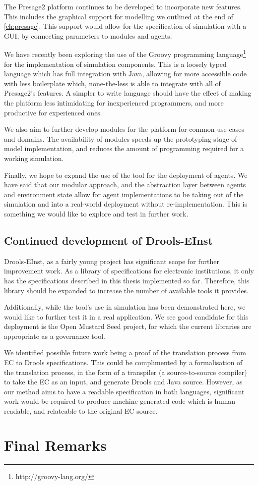 The Presage2 platform continues to be developed to incorporate new features.
This includes the graphical support for modelling we outlined at the end of
\autoref{ch:presage}. This support would allow for the specification of
simulation with a \ac{GUI}, by connecting parameters to modules and agents.

We have recently been exploring the use of the Groovy programming language\footnote{http://groovy-lang.org/} for
the implementation of simulation components. This is a loosely typed language
which has full integration with Java, allowing for more accessible code with
less boilerplate which, none-the-less is able to integrate with all of
Presage2's features. A simpler to write language should have the effect of
making the platform less intimidating for inexperienced programmers, and more
productive for experienced ones.

We also aim to further develop modules for the platform for common use-cases
and domains. The availability of modules speeds up the prototyping stage of
model implementation, and reduces the amount of programming required for a
working simulation.

Finally, we hope to expand the use of the tool for the deployment of agents.
We have said that our modular approach, and the abstraction layer between
agents and environment state allow for agent implementations to be taking out
of the simulation and into a real-world deployment without re-implementation.
This is something we would like to explore and test in further work.

\subsection{Continued development of Drools-EInst}

Drools-EInst, as a fairly young project has significant scope for further
improvement work. As a library of specifications for electronic institutions,
it only has the specifications described in this thesis implemented so far.
Therefore, this library should be expanded to increase the number of available
tools it provides.

Additionally, while the tool's use in simulation has been demonstrated here,
we would like to further test it in a real application. We see good candidate for
this deployment is the Open Mustard Seed project, for which the current
libraries are appropriate as a governance tool.

We identified possible future work being a proof of the translation process
from \ac{EC} to Drools specifications. This could be complimented by a
formalisation of the translation process, in the form of a transpiler (a
source-to-source compiler) to take the \ac{EC} as an input, and generate
Drools and Java source. However, as our method aims to have a readable
specification in both languages, significant work would be required to produce
machine generated code which is human-readable, and relateable to the original
\ac{EC} source.

\section{Final Remarks}
